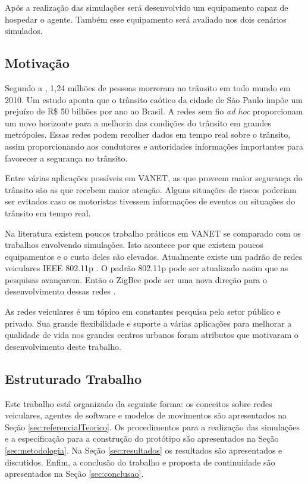 Após a realização das simulações será desenvolvido um equipamento capaz de hospedar o agente. Também esse equipamento será avaliado nos dois cenários simulados.  

\subsection{Motivação}

Segundo a \cite{oms:2013}, 1,24 milhões de pessoas morreram no trânsito em todo mundo em 2010. Um estudo \cite{Cintra:2012} aponta que o trânsito caótico da cidade de São Paulo impõe um prejuízo de R\$ 50 bilhões por ano ao Brasil. A redes sem fio \emph{ad hoc} proporcionam um novo horizonte para a melhoria das condições do trânsito em grandes metrópoles. Essas redes podem recolher dados em tempo real sobre o trânsito, assim proporcionando aos condutores e autoridades informações importantes para favorecer a segurança no trânsito.  	

Entre várias aplicações possíveis em VANET, as que proveem maior segurança do trânsito são as que recebem maior atenção. Alguns situações de riscos poderiam ser evitados caso os motoristas tivessem informações de eventos ou situações do trânsito em tempo real.

Na literatura existem poucos trabalho práticos em VANET se comparado com os trabalhos envolvendo simulações. Isto acontece por que existem poucos equipamentos e o custo deles são elevados. Atualmente existe um padrão de redes veiculares IEEE 802.11p \cite{Jiang:2008}. O padrão 802.11p pode ser atualizado assim que as pesquisas avançarem. Então o ZigBee pode ser uma nova direção para o desenvolvimento dessas redes \cite{Bhargav:2013}. 

As redes veiculares é um tópico em constantes pesquisa pelo setor público e privado. Sua grande flexibilidade e suporte a várias aplicações para melhorar a qualidade de vida nos grandes centros urbanos foram atributos que motivaram o desenvolvimento deste trabalho.

\subsection{Estruturado Trabalho}

Este trabalho está organizado da seguinte forma: os conceitos sobre redes veiculares, agentes de software e modelos de movimentos são apresentados na Seção \ref{sec:referencialTeorico}. Os procedimentos para a realização das simulações e a especificação para a construção do protótipo são apresentados na Seção \ref{sec:metodologia}. Na Seção \ref{sec:resultados} os resultados são apresentados e discutidos. Enfim, a conclusão do trabalho e proposta de continuidade são apresentados na Seção \ref{sec:conclusao}.
